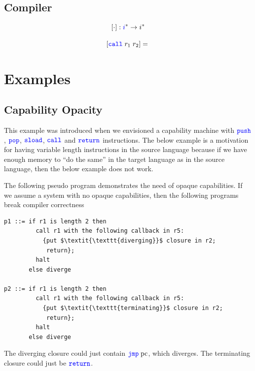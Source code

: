 \documentclass[a4paper]{article}
\newcommand{\fun}{\rightarrow}
\newcommand{\sourcecolor}[1]{\color{blue}}
\newcommand{\src}[1]{{\sourcecolor{} #1}}
\newcommand{\targetcolor}[1]{\color{black}}
\newcommand{\trg}[1]{{\targetcolor{} #1}}
\newcommand{\zinstr}[1]{\texttt{#1}}
\newcommand{\oneinstr}[2]{
  \ifthenelse{\equal{#2}{}}
  {\zinstr{#1}}
  {\zinstr{#1} \; #2}
}
\newcommand{\twoinstr}[3]{
  \ifthenelse{\equal{#2#3}{}}
  {\zinstr{#1}}
  {\zinstr{#1} \; #2 \; #3}
}
\newcommand{\sreturn}{\zinstr{\src{return}}}
\newcommand{\sjmp}[1]{\oneinstr{\src{jmp}}{#1}}
\newcommand{\spush}[1]{\oneinstr{\src{push}}{#1}}
\newcommand{\spop}[1]{\oneinstr{\src{pop}}{#1}}
\newcommand{\ssload}[2]{\twoinstr{\src{sload}}{#1}{#2}}
\newcommand{\scall}[2]{\twoinstr{\src{call}}{#1}{#2}}
\newcommand{\pcreg}{\mathrm{pc}}
\newcommand{\comp}[1]{[#1]}
\begin{document}
\subsection{Compiler}
\[
\comp{\cdot} : \src{i}^* \fun \trg{i}^*
\]

\[
  \comp{\scall{r_1}{r_2}} = 
  \begin{array}[t]{l}
  \end{array}
\]

\clearpage
\section{Examples}
\subsection{Capability Opacity}
\label{subsec:capability-opacity}
This example was introduced when we envisioned a capability machine with $\spush{}$, $\spop{}$, $\ssload{}{}$, $\scall{}{}$ and $\sreturn$ instructions. The below example is a motivation for having variable length instructions in the source language because if we have enough memory to ``do the same'' in the target language as in the source language, then the below example does not work.

The following pseudo program demonstrates the need of opaque capabilities. If we assume a system with no opaque capabilities, then the following programs break compiler correctness
\begin{lstlisting}[basicstyle=\sourcecolor{}\ttfamily] 
p1 ::= if r1 is length 2 then
         call r1 with the following callback in r5:
           {put $\textit{\texttt{diverging}}$ closure in r2;
            return};
         halt
       else diverge

p2 ::= if r1 is length 2 then
         call r1 with the following callback in r5:
           {put $\textit{\texttt{terminating}}$ closure in r2;
            return};
         halt
       else diverge
\end{lstlisting}
The diverging closure could just contain $\sjmp{\pcreg}$, which diverges. The terminating closure could just be $\sreturn$.
\end{document}
